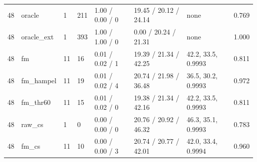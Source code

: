 \begin{table}[ht]
\begin{tabular}{llllllll}
48 & oracle & 1 & 211 & 1.00 / 0.00 / 0 & 19.45 / 20.12 / 24.14 & none & 0.769 \\
48 & oracle\_ext & 1 & 393 & 1.00 / 1.00 / 0 & 0.00 / 20.24 / 21.31 & none & 1.000 \\
48 & fm & 11 & 16 & 0.01 / 0.02 / 1 & 19.39 / 21.34 / 42.25 & 42.2, 33.5, 0.9993 & 0.811 \\
48 & fm\_hampel & 11 & 19 & 0.01 / 0.02 / 4 & 20.74 / 21.98 / 36.48 & 36.5, 30.2, 0.9993 & 0.972 \\
48 & fm\_thr60 & 11 & 15 & 0.01 / 0.02 / 0 & 19.38 / 21.34 / 42.16 & 42.2, 33.5, 0.9993 & 0.811 \\
48 & raw\_cs & 1 & 0 & 0.00 / 0.00 / 0 & 20.76 / 20.92 / 46.32 & 46.3, 35.1, 0.9993 & 0.783 \\
48 & fm\_cs & 11 & 10 & 0.00 / 0.00 / 3 & 20.74 / 20.77 / 42.01 & 42.0, 33.4, 0.9994 & 0.960 \\
\bottomrule
\end{tabular}
\end{table}
